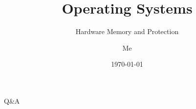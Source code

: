\documentclass[12pt]{beamer}
\title{Operating Systems}
\subtitle{Hardware Memory and Protection}
\author{Me}
\date{\today}
\begin{document}
  \begin{frame}
    \titlepage
  \end{frame}

  
  

  \begin{frame}
  \begin{center}
  \Huge Q\&A
  \end{center}
  \end{frame}
\end{document}
